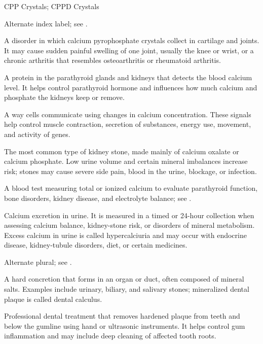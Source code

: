 \synonyms
CPP Crystals; CPPD Crystals

 Alternate index label; see .

 A disorder in which calcium pyrophosphate crystals collect in cartilage and joints. It may cause sudden painful swelling of one joint, usually the knee or wrist, or a chronic arthritis that resembles osteoarthritis or rheumatoid arthritis.

 A protein in the parathyroid glands and kidneys that detects the blood calcium level. It helps control parathyroid hormone and influences how much calcium and phosphate the kidneys keep or remove.

 A way cells communicate using changes in calcium concentration. These signals help control muscle contraction, secretion of substances, energy use, movement, and activity of genes.

 The most common type of kidney stone, made mainly of calcium oxalate or calcium phosphate. Low urine volume and certain mineral imbalances increase risk; stones may cause severe side pain, blood in the urine, blockage, or infection.

 A blood test measuring total or ionized calcium to evaluate parathyroid function, bone disorders, kidney disease, and electrolyte balance; see .

 Calcium excretion in urine. It is measured in a timed or 24-hour
collection when assessing calcium balance, kidney-stone risk, or disorders of mineral
metabolism. Excess calcium in urine is called hypercalciuria and may occur with endocrine
disease, kidney-tubule disorders, diet, or certain medicines.

 Alternate plural; see .

 A hard concretion that forms in an organ or duct, often composed of mineral salts. Examples include urinary, biliary, and salivary stones; mineralized dental plaque is called dental calculus.

 Professional dental treatment that removes hardened plaque from teeth and below the gumline using hand or ultrasonic instruments. It helps control gum inflammation and may include deep cleaning of affected tooth roots.

